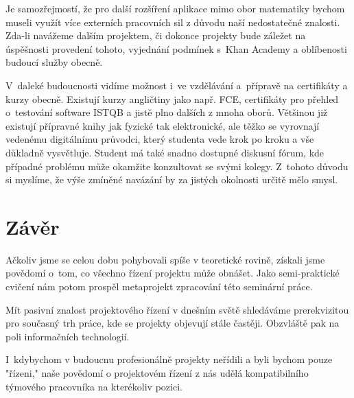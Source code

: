 \documentclass[12pt, a4paper]{report}
\begin{document}
Je samozřejmostí, že pro další rozšíření aplikace mimo obor matematiky bychom
museli využít více externích pracovních sil z důvodu naší nedostatečné znalosti.
Zda-li navážeme dalším projektem, či dokonce projekty bude záležet na úspěšnosti
provedení tohoto, vyjednání podmínek s Khan Academy a oblíbenosti budoucí služby
obecně.

V daleké budoucnosti vidíme možnost i ve vzdělávání a přípravě na certifikáty a
kurzy obecně. Existují kurzy angličtiny jako např. FCE, certifikáty pro přehled
o testování software ISTQB a jistě plno dalších z mnoha oborů. Většinou již
existují přípravné knihy jak fyzické tak elektronické, ale těžko se vyrovnají
vedenému digitálnímu průvodci, který studenta vede krok po kroku a vše důkladně
vysvětluje. Student má také snadno dostupné diskusní fórum, kde případné
problému může okamžite konzultovat se svými kolegy. Z tohoto důvodu si myslíme,
že výše zmíněné navázání by za jistých okolnosti určitě mělo smysl.

\chapter{Závěr}
\label{sec:org259fe00}
Ačkoliv jsme se celou dobu pohybovali spíše v teoretické rovině, získali jsme
povědomí o tom, co všechno řízení projektu může obnášet. Jako semi-praktické
cvičení nám potom prospěl metaprojekt zpracování této seminární práce.

Mít pasivní znalost projektového řízení v dnešním světě shledáváme prerekvizitou
pro současný trh práce, kde se projekty objevují stále častěji. Obzvláště pak na
poli informačních technologií.

I kdybychom v budoucnu profesionálně projekty neřídili a byli bychom pouze
"řízeni," naše povědomí o projektovém řízení z nás udělá kompatibilního týmového
pracovníka na kterékoliv pozici.



\printbibliography
\end{document}
